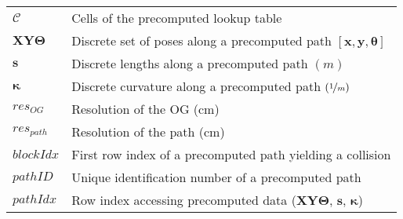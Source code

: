 \documentclass[oneside,english,master=wtk,inputenc="utf8"]{kulemt}
\newcommand{\nf}{\nicefrac}
\begin{document}
\begin{flushleft}
\begin{tabularx}{\textwidth}{@{}p{16mm}X@{}}
$\mathcal{C}$ 		& Cells of the precomputed lookup table\\
$\bm{XY\Theta}$ 	& Discrete set of poses along a precomputed path $[\bm{x},\bm{y},\bm{\theta}]$ \\
$\bm{s}$ 				& Discrete lengths along a precomputed path  $(m)$ \\
$\bm{\kappa}$ 		& Discrete curvature along a precomputed path $(\nf{1}{m})$   \\
$res_{OG}$			& Resolution of the OG (cm)\\ 
$res_{path}$			& Resolution of the path (cm)\\ 
$blockIdx$ 				& First row index of a precomputed path yielding a collision   \\
$pathID$  				& Unique identification number of a precomputed path \\
$pathIdx$ 				&	Row index accessing precomputed data ($\bm{XY\Theta}$, $\bm{s}$, $\bm{\kappa}$)
\end{tabularx}
\end{flushleft}

\mainmatter






\appendixpage*
\appendix



\backmatter


\end{document}
